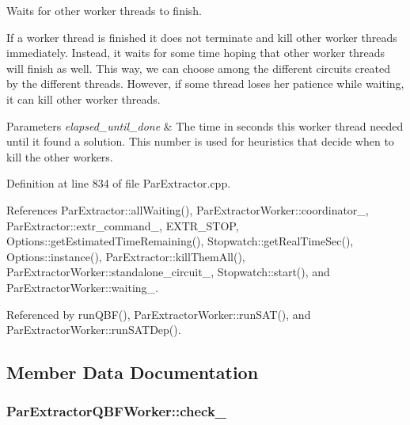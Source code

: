 Waits for other worker threads to finish. 

If a worker thread is finished it does not terminate and kill other worker threads immediately. Instead, it waits for some time hoping that other worker threads will finish as well. This way, we can choose among the different circuits created by the different threads. However, if some thread loses her patience while waiting, it can kill other worker threads.


\begin{DoxyParams}{Parameters}
{\em elapsed\-\_\-until\-\_\-done} & The time in seconds this worker thread needed until it found a solution. This number is used for heuristics that decide when to kill the other workers. \\
\hline
\end{DoxyParams}


Definition at line 834 of file Par\-Extractor.\-cpp.



References Par\-Extractor\-::all\-Waiting(), Par\-Extractor\-Worker\-::coordinator\-\_\-, Par\-Extractor\-::extr\-\_\-command\-\_\-, E\-X\-T\-R\-\_\-\-S\-T\-O\-P, Options\-::get\-Estimated\-Time\-Remaining(), Stopwatch\-::get\-Real\-Time\-Sec(), Options\-::instance(), Par\-Extractor\-::kill\-Them\-All(), Par\-Extractor\-Worker\-::standalone\-\_\-circuit\-\_\-, Stopwatch\-::start(), and Par\-Extractor\-Worker\-::waiting\-\_\-.



Referenced by run\-Q\-B\-F(), Par\-Extractor\-Worker\-::run\-S\-A\-T(), and Par\-Extractor\-Worker\-::run\-S\-A\-T\-Dep().



\subsection{Member Data Documentation}
\hypertarget{classParExtractorQBFWorker_a062f6a65b3c42b1077cc8438b067fe03}{
\subsubsection[{check\-\_\-}]{ Par\-Extractor\-Q\-B\-F\-Worker\-::check\-\_\-\hspace{0.3cm}{\ttfamily [protected]}}}\label{classParExtractorQBFWorker_a062f6a65b3c42b1077cc8438b067fe03}


